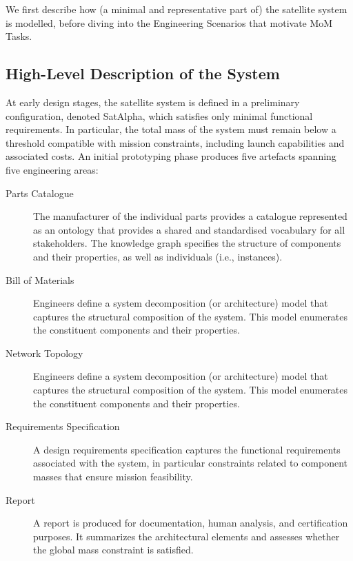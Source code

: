 \documentclass{article}
\begin{document}
We first describe how (a minimal and representative part of) the satellite system is modelled, before diving into the
Engineering Scenarios that motivate MoM Tasks.


\subsection{High-Level Description of the System}
\label{sec:CD-SHLD}

At early design stages, the satellite system is defined in a preliminary
configuration, denoted \textsf{SatAlpha}, which satisfies only minimal functional
requirements. In particular, the total mass of the system must remain below a
threshold compatible with mission constraints, including launch capabilities and
associated costs. An initial prototyping phase produces five artefacts spanning
five engineering areas:

\begin{description}
    \item[Parts Catalogue] The manufacturer of the individual parts provides a catalogue represented as an ontology that provides a shared and standardised vocabulary for all stakeholders. The knowledge graph specifies the structure of components and their properties, as well as individuals (i.e., instances).
   
	\item[Bill of Materials] 
   Engineers define a system decomposition (or architecture) model that
   captures the structural composition of the system. This model enumerates the
   constituent components and their properties.

   \item[Network Topology]
    Engineers define a system decomposition (or architecture) model that
   captures the structural composition of the system. This model enumerates the
   constituent components and their properties.
   
	\item[Requirements Specification] 
   A design requirements specification captures the functional
   requirements associated with the system, in particular constraints related to
   component masses that ensure mission feasibility.

	\item[Report] 
   A report is produced for documentation, human analysis, and
   certification purposes. It summarizes the architectural elements and assesses
   whether the global mass constraint is satisfied.
\end{description}
\end{document}

